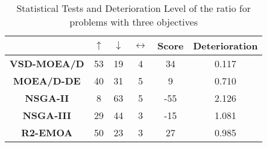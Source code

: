 \begin{table}[t]
\caption{Statistical Tests and Deterioration Level of the \HV{} ratio for problems with three objectives}
\label{tab:Tests_HV_3obj}
\centering
\begin{tabular}{c c|c|c|c|c}
\cline{2-6}
 & \textbf{$\uparrow$} & \textbf{$\downarrow$} & \textbf{$\leftrightarrow$} & \textbf{Score} & \textbf{Deterioration} \\ \hline
\multicolumn{1}{c|}{\textbf{VSD-MOEA/D}} & 53 & 19 & 4 & 34 & 0.117 \\ \hline
\multicolumn{1}{c|}{\textbf{MOEA/D-DE}} & 40 & 31 & 5 & 9 & 0.710 \\ \hline
\multicolumn{1}{c|}{\textbf{NSGA-II}} & 8 & 63 & 5 & -55 & 2.126 \\ \hline
\multicolumn{1}{c|}{\textbf{NSGA-III}} & 29 & 44 & 3 & -15 & 1.081 \\ \hline
\multicolumn{1}{c|}{\textbf{R2-EMOA}} & 50 & 23 & 3 & 27 & 0.985 \\ \hline
\end{tabular}%
\end{table}



%
